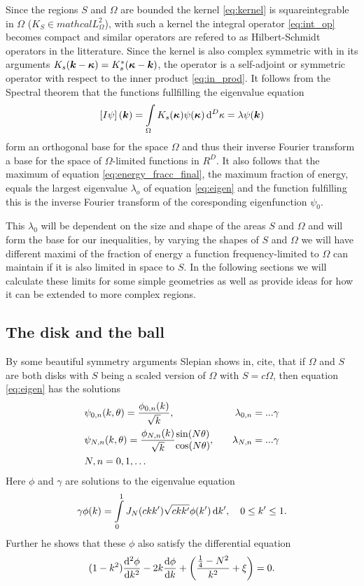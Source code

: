 \documentclass[11pt,a4paper, 
english, swedish %
]{article}
\newcommand{\Lsq}[1]{\ensuremath{mathcal{L}^2_{#1}}}
\begin{document}
Since the regions $S$ and $\Omega$ are bounded the kernel \eqref{eq:kernel} is squareintegrable in $\Omega$ ($K_S \in \Lsq{\Omega}$), with such a kernel the integral operator \eqref{eq:int_op} becomes compact and similar operators are refered to as Hilbert-Schmidt operators in the litterature. Since the kernel is also complex symmetric with in its arguments $K_s(\vb*k-\vb*\kappa)=K_s^*(\vb*\kappa-\vb*k)$, the operator is a self-adjoint or symmetric operator with respect to the inner product \eqref{eq:in_prod}. It follows from the Spectral theorem that the functions fullfilling the eigenvalue equation
\begin{equation}
  \label{eq:eigen}
\qty[I\psi](\vb*k)=\int_\Omega K_s(\vb*\kappa)\psi(\vb*\kappa) \id^D\kappa=\lambda \psi(\vb*k)
\end{equation}
form an orthogonal base for the space $\Omega$ and thus their inverse Fourier transform a base for the space of $\Omega$-limited functions in $R^D$. It also follows that the maximum of equation \eqref{eq:energy_fracc_final}, the maximum fraction of energy, equals the largest eigenvalue $\lambda_o$ of equation \eqref{eq:eigen} and the function fulfilling this is the inverse Fourier transform of the coresponding eigenfunction $\psi_0$.

This $\lambda_0$ will be dependent on the size and shape of the areas $S$ and $\Omega$ and will form the base for our inequalities, by varying the shapes of $S$ and $\Omega$ we will have different maximi of the fraction of energy a function frequency-limited to $\Omega$ can maintain if it is also limited in space to $S$. In the following sections we will calculate these limits for some simple geometries as well as provide ideas for how it can be extended to more complex regions.

\subsection{The disk and the ball}
By some beautiful symmetry arguments Slepian shows in, cite, that if $\Omega$ and $S$ are both disks with $S$ being a scaled version of $\Omega$ with $S=c\Omega$, then equation \eqref{eq:eigen} has the solutions
\begin{align}
 &\psi_{0,n}(k,\theta)=\frac{\phi_{0,n}(k)}{\sqrt{k}}, \quad &\lambda_{0,n}= ...\gamma \\
  &\psi_{N,n}(k, \theta)=\frac{\phi_{N,n}(k)}{\sqrt{k}}\mqty{\sin(N\theta)\\ \cos(N\theta)} , \quad &\lambda_{N,n}= ... \gamma\\
  &N,n=0,1,\ldots
\end{align}
Here $\phi$ and $\gamma$ are solutions to the eigenvalue equation
\begin{equation}
  \label{eq:Bessel_int}
\gamma\phi(k)=\int_0^1 J_N(ckk')\sqrt{ckk'}\phi(k')\id k', \quad 0\leq k' \leq 1.
\end{equation}
Further he shows that these $\phi$ also satisfy the differential equation
\begin{equation}
  \label{eq:Bessel_diff}
(1-k^2)\dv[2]{\phi}{k}-2k\dv{\phi}{k} +\qty(\frac{\frac{1}{4}-N^2}{k^2}+\xi)=0.
\end{equation}
\end{document}
